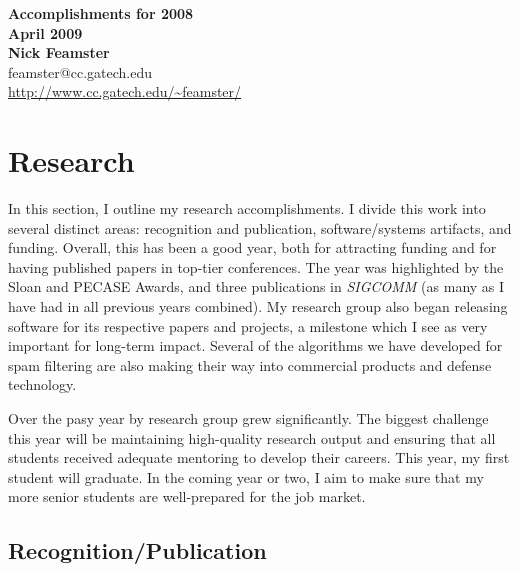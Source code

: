 \newpage 

\setcounter{page}{1}

\setcounter{page}{1}
\begin{center}
{\Large\textbf{Accomplishments for 2008 \\ April 2009}}\\[.1in]
{\large\textbf{Nick Feamster}}\\[.05in]
feamster@cc.gatech.edu \\
\url{http://www.cc.gatech.edu/~feamster/} \\[.1in]
\end{center}

\begin{sloppypar}

\section*{Research}

In this section, I outline my research accomplishments.  I divide this
work into several distinct areas: recognition and publication,
software/systems artifacts, and funding.  Overall, this has been a good
year, both for attracting funding and for having published papers in
top-tier conferences.  The year was highlighted by the Sloan and PECASE
Awards, and three publications in {\em SIGCOMM} (as many as I have had
in all previous years combined).  My research group also began releasing
software for its respective papers and projects, a milestone which I see
as very important for long-term impact.  Several of the algorithms we
have developed for spam filtering are also making their way into
commercial products and defense technology.

Over the pasy year by research group grew significantly.  The biggest
challenge this year will be maintaining high-quality research output and
ensuring that all students received adequate mentoring to develop their
careers.  This year, my first student will graduate.  In the coming year
or two, I aim to make sure that my more senior students are
well-prepared for the job market. 

\subsection*{Recognition/Publication}


\end{sloppypar}
